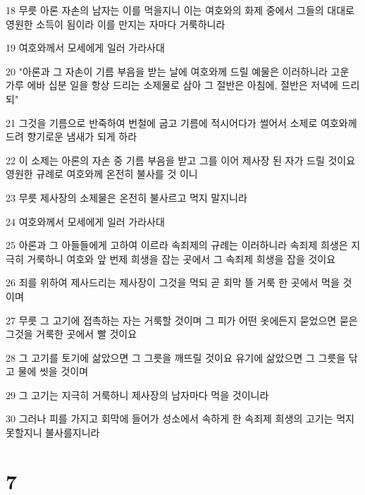 \par 18 무릇 아론 자손의 남자는 이를 먹을지니 이는 여호와의 화제 중에서 그들의 대대로 영원한 소득이 됨이라 이를 만지는 자마다 거룩하니라
\par 19 여호와께서 모세에게 일러 가라사대
\par 20 "아론과 그 자손이 기름 부음을 받는 날에 여호와께 드릴 예물은 이러하니라 고운 가루 에바 십분 일을 항상 드리는 소제물로 삼아 그 절반은 아침에, 절반은 저녁에 드리되"
\par 21 그것을 기름으로 반죽하여 번철에 굽고 기름에 적시어다가 썰어서 소제로 여호와께 드려 향기로운 냄새가 되게 하라
\par 22 이 소제는 아론의 자손 중 기름 부음을 받고 그를 이어 제사장 된 자가 드릴 것이요 영원한 규례로 여호와께 온전히 불사를 것 이니
\par 23 무릇 제사장의 소제물은 온전히 불사르고 먹지 말지니라
\par 24 여호와께서 모세에게 일러 가라사대
\par 25 아론과 그 아들들에게 고하여 이르라 속죄제의 규례는 이러하니라 속죄제 희생은 지극히 거룩하니 여호와 앞 번제 희생을 잡는 곳에서 그 속죄제 희생을 잡을 것이요
\par 26 죄를 위하여 제사드리는 제사장이 그것을 먹되 곧 회막 뜰 거룩 한 곳에서 먹을 것이며
\par 27 무릇 그 고기에 접촉하는 자는 거룩할 것이며 그 피가 어떤 옷에든지 묻었으면 묻은 그것을 거룩한 곳에서 빨 것이요
\par 28 그 고기를 토기에 삶았으면 그 그릇을 깨뜨릴 것이요 유기에 삶았으면 그 그릇을 닦고 물에 씻을 것이며
\par 29 그 고기는 지극히 거룩하니 제사장의 남자마다 먹을 것이니라
\par 30 그러나 피를 가지고 회막에 들어가 성소에서 속하게 한 속죄제 희생의 고기는 먹지 못할지니 불사를지니라

\chapter{7}

